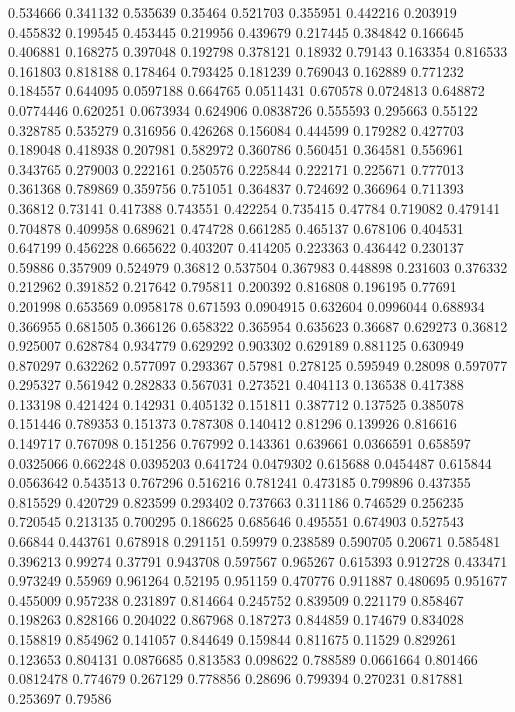 0.534666 0.341132
0.535639 0.35464
0.521703 0.355951
0.442216 0.203919
0.455832 0.199545
0.453445 0.219956
0.439679 0.217445
0.384842 0.166645
0.406881 0.168275
0.397048 0.192798
0.378121 0.18932
0.79143 0.163354
0.816533 0.161803
0.818188 0.178464
0.793425 0.181239
0.769043 0.162889
0.771232 0.184557
0.644095 0.0597188
0.664765 0.0511431
0.670578 0.0724813
0.648872 0.0774446
0.620251 0.0673934
0.624906 0.0838726
0.555593 0.295663
0.55122 0.328785
0.535279 0.316956
0.426268 0.156084
0.444599 0.179282
0.427703 0.189048
0.418938 0.207981
0.582972 0.360786
0.560451 0.364581
0.556961 0.343765
0.279003 0.222161
0.250576 0.225844
0.222171 0.225671
0.777013 0.361368
0.789869 0.359756
0.751051 0.364837
0.724692 0.366964
0.711393 0.36812
0.73141 0.417388
0.743551 0.422254
0.735415 0.47784
0.719082 0.479141
0.704878 0.409958
0.689621 0.474728
0.661285 0.465137
0.678106 0.404531
0.647199 0.456228
0.665622 0.403207
0.414205 0.223363
0.436442 0.230137
0.59886 0.357909
0.524979 0.36812
0.537504 0.367983
0.448898 0.231603
0.376332 0.212962
0.391852 0.217642
0.795811 0.200392
0.816808 0.196195
0.77691 0.201998
0.653569 0.0958178
0.671593 0.0904915
0.632604 0.0996044
0.688934 0.366955
0.681505 0.366126
0.658322 0.365954
0.635623 0.36687
0.629273 0.36812
0.925007 0.628784
0.934779 0.629292
0.903302 0.629189
0.881125 0.630949
0.870297 0.632262
0.577097 0.293367
0.57981 0.278125
0.595949 0.28098
0.597077 0.295327
0.561942 0.282833
0.567031 0.273521
0.404113 0.136538
0.417388 0.133198
0.421424 0.142931
0.405132 0.151811
0.387712 0.137525
0.385078 0.151446
0.789353 0.151373
0.787308 0.140412
0.81296 0.139926
0.816616 0.149717
0.767098 0.151256
0.767992 0.143361
0.639661 0.0366591
0.658597 0.0325066
0.662248 0.0395203
0.641724 0.0479302
0.615688 0.0454487
0.615844 0.0563642
0.543513 0.767296
0.516216 0.781241
0.473185 0.799896
0.437355 0.815529
0.420729 0.823599
0.293402 0.737663
0.311186 0.746529
0.256235 0.720545
0.213135 0.700295
0.186625 0.685646
0.495551 0.674903
0.527543 0.66844
0.443761 0.678918
0.291151 0.59979
0.238589 0.590705
0.20671 0.585481
0.396213 0.99274
0.37791 0.943708
0.597567 0.965267
0.615393 0.912728
0.433471 0.973249
0.55969 0.961264
0.52195 0.951159
0.470776 0.911887
0.480695 0.951677
0.455009 0.957238
0.231897 0.814664
0.245752 0.839509
0.221179 0.858467
0.198263 0.828166
0.204022 0.867968
0.187273 0.844859
0.174679 0.834028
0.158819 0.854962
0.141057 0.844649
0.159844 0.811675
0.11529 0.829261
0.123653 0.804131
0.0876685 0.813583
0.098622 0.788589
0.0661664 0.801466
0.0812478 0.774679
0.267129 0.778856
0.28696 0.799394
0.270231 0.817881
0.253697 0.79586

